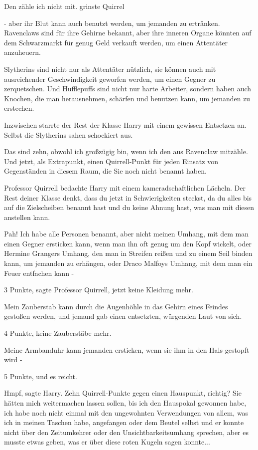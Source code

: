 \glqq{}Den zähle ich nicht mit.\grqq{} grinste Quirrel

\glqq{}- aber ihr Blut kann auch benutzt werden, um jemanden zu ertränken.
Ravenclaws sind für ihre Gehirne bekannt, aber ihre inneren Organe könnten auf
dem Schwarzmarkt für genug Geld verkauft werden, um einen Attentäter anzuheuern.

Slytherins sind nicht nur als Attentäter nützlich, sie können auch mit
ausreichender Geschwindigkeit geworfen werden, um einen Gegner zu zerquetschen.
Und Hufflepuffs sind nicht nur harte Arbeiter, sondern haben auch Knochen, die
man herausnehmen, schärfen und benutzen kann, um jemanden zu erstechen.\grqq{}

Inzwischen starrte der Rest der Klasse Harry mit einem gewissen Entsetzen an.
Selbst die Slytherins sahen schockiert aus.

\glqq{}Das sind zehn, obwohl ich großzügig bin, wenn ich den aus Ravenclaw
mitzähle. Und jetzt, als Extrapunkt, einen Quirrell-Punkt für jeden Einsatz von
Gegenständen in diesem Raum, die Sie noch nicht benannt haben.\grqq{}

Professor Quirrell bedachte Harry mit einem kameradschaftlichen Lächeln. \glqq
Der Rest deiner Klasse denkt, dass du jetzt in Schwierigkeiten steckst, da du
alles bis auf die Zielscheiben benannt hast und du keine Ahnung hast, was man
mit diesen anstellen kann.\grqq{}

\glqq{}Pah! Ich habe alle Personen benannt, aber nicht meinen Umhang, mit dem man
einen Gegner ersticken kann, wenn man ihn oft genug um den Kopf wickelt, oder
Hermine Grangers Umhang, den man in Streifen reißen und zu einem Seil binden
kann, um jemanden zu erhängen, oder Draco Malfoys Umhang, mit dem man ein Feuer
entfachen kann -\grqq{}

\glqq{}3 Punkte\grqq{}, sagte Professor Quirrell, \glqq{}jetzt keine Kleidung
mehr.\grqq{}

\glqq{}Mein Zauberstab kann durch die Augenhöhle in das Gehirn eines Feindes
gestoßen werden\grqq{}, und jemand gab einen entsetzten, würgenden Laut von
sich.

\glqq{}4 Punkte, keine Zauberstäbe mehr.\grqq{}

\glqq{}Meine Armbanduhr kann jemanden ersticken, wenn sie ihm in den Hals
gestopft wird -\grqq{}

\glqq{}5 Punkte, und es reicht.\grqq{}

\glqq{}Hmpf\grqq{}, sagte Harry. \glqq{}Zehn Quirrell-Punkte gegen einen
Hauspunkt, richtig? Sie hätten mich weitermachen lassen sollen, bis ich den
Hauspokal gewonnen habe, ich habe noch nicht einmal mit den ungewohnten
Verwendungen von allem, was ich in meinen Taschen habe, angefangen\grqq{} oder
dem Beutel selbst und er konnte nicht über den Zeitumkehrer oder den
Unsichtbarkeitsumhang sprechen, aber es musste etwas geben, was er über diese
roten Kugeln sagen konnte...

